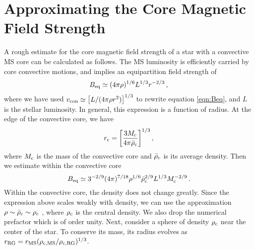 \section{Approximating the Core Magnetic Field Strength}

A rough estimate for the core magnetic field strength of a star with a convective MS core can be calculated as follows. The MS luminosity is efficiently carried by core convective motions, and implies an equipartition field strength of 
\begin{equation}
\label{eqn:Beq2}
B_{\rm eq} \simeq (4 \pi \rho)^{1/6} L^{1/3} r^{-2/3} \, ,
\end{equation}
where we have used $v_{\rm con} \simeq \big[L/(4 \pi \rho r^2)\big]^{1/3}$ to rewrite equation \ref{eqn:Beq}, and $L$ is the stellar luminosity. In general, this expression is a function of radius. At the edge of the convective core, we have
\begin{equation}
\label{eqn:rc}
r_{\rm c} = \bigg[ \frac{3 M_{\rm c}}{4 \pi {\bar \rho}_{\rm c}} \bigg]^{1/3} \, ,
\end{equation}
where $M_{\rm c}$ is the mass of the convective core and ${\bar \rho}_{\rm c}$ is its average density. Then we estimate within the convective core
\begin{equation}
\label{eqn:Beq3}
B_{\rm eq} \simeq 3^{-2/9} (4 \pi)^{7/18} \rho^{1/6} {\bar \rho}_{\rm c}^{2/9} L^{1/3} M_{\rm c}^{-2/9} \, .
\end{equation}
Within the convective core, the density does not change greatly. Since the expression above scales weakly with density, we can use the approximation $\rho \sim {\bar \rho}_{\rm c} \sim \rho_{\rm c}$ , where $\rho_{\rm c}$ is the central density. We also drop the numerical prefactor which is of order unity. Next, consider a sphere of density $\rho_{\rm c}$ near the center of the star. To conserve its mass, its radius evolves as $r_{\rm RG} = r_{\rm MS} (\rho_{\rm c,MS}/\rho_{\rm c,RG})^{1/3}$.


